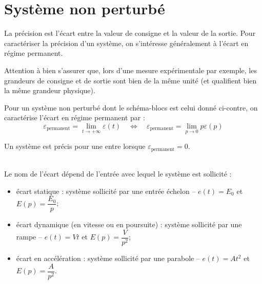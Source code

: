 \documentclass[10pt,fleqn]{article} %
\begin{document}

\setlength{\columnseprule}{.1pt}

\vspace{2cm}
\pagestyle{fancy}
\thispagestyle{plain}
\section{Système non perturbé}
\begin{defi}
La précision est l'écart entre la valeur de consigne et la valeur de la sortie. Pour caractériser la précision d'un système, on s'intéresse généralement à l'écart en régime permanent.

Attention à bien s'assurer que, lors d'une mesure expérimentale par exemple, les grandeurs de consigne et de sortie sont bien de la même unité (et qualifient bien la même grandeur physique).

\vspace{.2cm}

\noindent \begin{minipage}[c]{.6\linewidth}
Pour un système non perturbé dont le schéma-blocs est celui donné ci-contre, on caractérise l'écart en régime permanent par :
$$
\varepsilon_{\text{permanent}}=\lim\limits_{t\to +\infty} \varepsilon(t)
\quad
\Longleftrightarrow 
\quad
\varepsilon_{\text{permanent}}=\lim\limits_{p\to 0} p\varepsilon(p)
$$
\end{minipage}
\hspace{.5cm}
\begin{minipage}[c]{.25\linewidth}

\end{minipage}

\end{defi}

\begin{defi}
Un système est précis pour une entre lorsque $\varepsilon_{\text{permanent}}=0$.
\end{defi}

\begin{defi} \~\\
Le nom de l'écart dépend de l'entrée avec lequel le système est sollicité : 
\begin{itemize}
\item écart statique : système sollicité par une entrée échelon -- $e(t)=E_0$ et $E(p)=\dfrac{E_0}{p}$;
\item écart dynamique (en vitesse ou en poursuite) : système sollicité par une rampe -- $e(t)=Vt$ et $E(p)=\dfrac{V}{p^2}$;
\item écart en accélération : système sollicité par une parabole  -- $e(t)=At^2$ et $E(p)=\dfrac{A}{p^2}$.
\end{itemize}
\end{defi}
\end{document}
